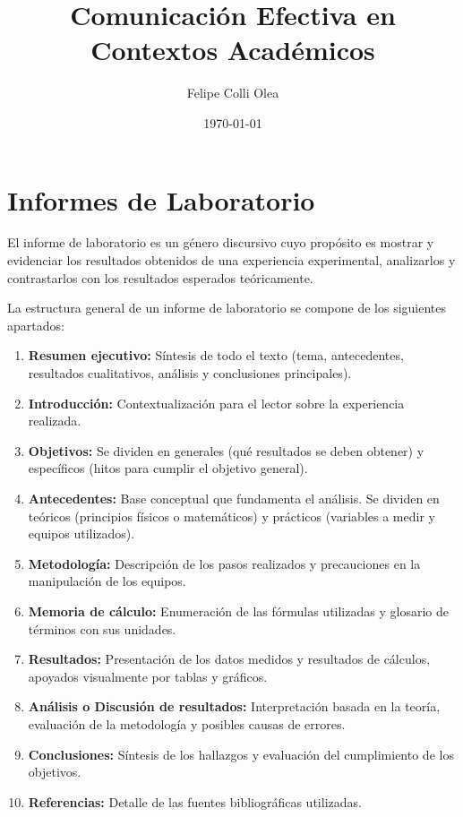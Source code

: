 \documentclass[11pt]{article}
\title{Comunicación Efectiva en Contextos Académicos}
\author{Felipe Colli Olea}
\date{\today}
\begin{document}
\maketitle
\thispagestyle{fancy}

\tableofcontents

\newpage

\section{Informes de Laboratorio}

El informe de laboratorio es un género discursivo cuyo propósito es mostrar y evidenciar los resultados obtenidos de una experiencia experimental, analizarlos y contrastarlos con los resultados esperados teóricamente.

La estructura general de un informe de laboratorio se compone de los siguientes apartados:
\begin{enumerate}
	\item \textbf{Resumen ejecutivo:} Síntesis de todo el texto (tema, antecedentes, resultados cualitativos, análisis y conclusiones principales).
	\item \textbf{Introducción:} Contextualización para el lector sobre la experiencia realizada.
	\item \textbf{Objetivos:} Se dividen en generales (qué resultados se deben obtener) y específicos (hitos para cumplir el objetivo general).
	\item \textbf{Antecedentes:} Base conceptual que fundamenta el análisis. Se dividen en teóricos (principios físicos o matemáticos) y prácticos (variables a medir y equipos utilizados).
	\item \textbf{Metodología:} Descripción de los pasos realizados y precauciones en la manipulación de los equipos.
	\item \textbf{Memoria de cálculo:} Enumeración de las fórmulas utilizadas y glosario de términos con sus unidades.
	\item \textbf{Resultados:} Presentación de los datos medidos y resultados de cálculos, apoyados visualmente por tablas y gráficos.
	\item \textbf{Análisis o Discusión de resultados:} Interpretación basada en la teoría, evaluación de la metodología y posibles causas de errores.
	\item \textbf{Conclusiones:} Síntesis de los hallazgos y evaluación del cumplimiento de los objetivos.
	\item \textbf{Referencias:} Detalle de las fuentes bibliográficas utilizadas.
\end{enumerate}
\end{document}
